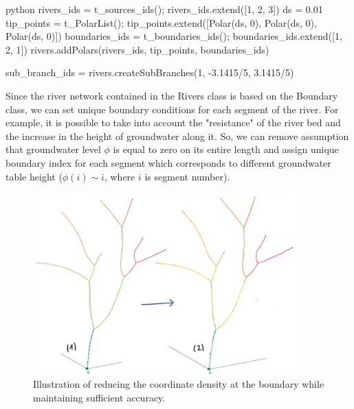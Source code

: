\documentclass[]{pracamgr}
\begin{document}
      \begin{mintedbox}{python}
        rivers_ids = t_sources_ids(); rivers_ids.extend([1, 2, 3])
        ds = 0.01
        tip_points = t_PolarList(); tip_points.extend([Polar(ds, 0), Polar(ds, 0), Polar(ds, 0)])
        boundaries_ids = t_boundaries_ids(); boundaries_ids.extend([1, 2, 1])
        rivers.addPolars(rivers_ids, tip_points, boundaries_ids)
      
        sub_branch_ids = rivers.createSubBranches(1, -3.1415/5, 3.1415/5)\end{mintedbox}

      Since the river network contained in the Rivers class is based on the Boundary class, we can set unique boundary conditions for each segment of the river. For example, it is possible to take into account the "resistance" of the river bed and the increase in the height of groundwater along it. So, we can remove assumption that groundwater level $\phi$ is equal to zero on its entire length and assign unique boundary index for each segment which corresponds to different groundwater table height ($\phi(i) \sim i$, where $i$ is segment number).

      \begin{figure}[H]
        \centering
        \includegraphics[width=0.9\textwidth]{figs/tree_coarsening.png}        
        \caption{Illustration of reducing the coordinate density at the boundary while maintaining sufficient accuracy.}
        \label{tree_coarsening}
      \end{figure}
\end{document}
